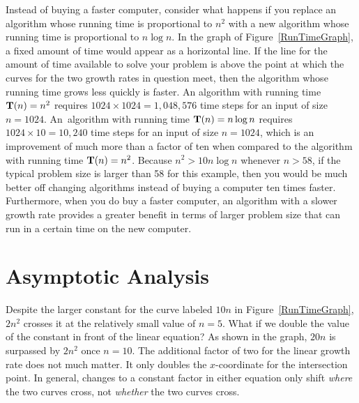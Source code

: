 Instead of buying a faster computer,
consider what happens if you replace an algorithm whose
running time is proportional to \(n^2\) with a new
algorithm whose running time is proportional to \(n \log n\).
In the graph of Figure~\ref{RunTimeGraph}, a fixed amount of time would
appear as a horizontal line.
If the line for the amount of time available to solve your problem
is above the point at which the curves for the two growth rates in
question meet, then the algorithm whose running time grows less
quickly is faster.
An algorithm with running time \(\mbox{$\textbf{T}(n)$}=n^2\) requires
\(1024 \times 1024 = 1,048,576\) time steps for an input of size
\(n=1024\).
An~algorithm with running time \(\mbox{$\textbf{T}(n)$}=n\log n\) requires
\(1024\times 10=10,240\) time steps for an input of size
\(n = 1024\), which is an improvement of much more than a factor of ten
when compared to the algorithm with running time \(\mbox{$\textbf{T}(n)$} = n^2\).
Because \(n^2 > 10 n \log n\) whenever \(n > 58\), if the typical
problem size is larger than 58 for this example, then you would be
much better off changing algorithms instead of buying a computer ten
times faster.
Furthermore, when you do buy a faster computer, an algorithm with a
slower growth rate provides a greater benefit in terms of larger
problem size that can run in a certain time on the new computer.

\newpage

\section{Asymptotic Analysis}

Despite the larger constant for the curve labeled
\(10 n\) in Figure~\ref{RunTimeGraph}, \(2 n^2\)
crosses it at the relatively small value of \(n = 5\).
What if we double the value of the constant in front of the linear
equation?
As shown in the graph, \(20 n\) is surpassed by \(2 n^2\)
once \(n = 10\).
The additional factor of two for the linear growth rate does not much
matter.
It only doubles the \(x\)-coordinate for the intersection point.
In general, changes to a constant factor in either equation only
shift \emph{where} the two curves cross, not \emph{whether}
the two curves cross.

